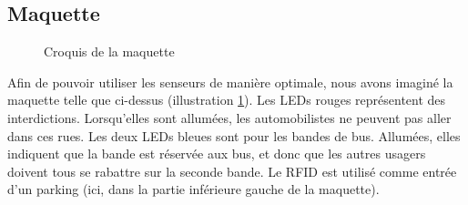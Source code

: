 \subsection{Maquette}
\begin{figure}[H]
    \begin{center}

        \caption{Croquis de la maquette}\label{croquis-maquette}
    \end{center}
\end{figure}
\vspace{-0.7cm}
Afin de pouvoir utiliser les senseurs de manière optimale, nous avons imaginé la maquette telle que ci-dessus (illustration \ref{croquis-maquette}). Les LEDs rouges représentent des interdictions. Lorsqu’elles sont allumées, les automobilistes ne peuvent pas aller dans ces rues. Les deux LEDs bleues sont pour les bandes de bus. Allumées, elles indiquent que la bande est réservée aux bus, et donc que les autres usagers doivent tous se rabattre sur la seconde bande. Le RFID est utilisé comme entrée d’un parking (ici, dans la partie inférieure gauche de la maquette).
